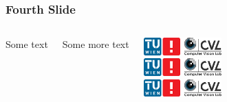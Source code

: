 \documentclass[xetex,professionalfont]{beamer}
\begin{document}

\begin{frame}
\frametitle{Fourth Slide}

\begin{columns}

Some text

Some more text


\begin{center}
\includegraphics[width=3cm]{tuwcvl.png}\\
\vspace{1cm}
\includegraphics[width=3cm]{tuwcvl.png}\\
\vspace{1cm}
\includegraphics[width=3cm]{tuwcvl.png}
\end{center}

\end{columns}

\end{frame}
\end{document}
